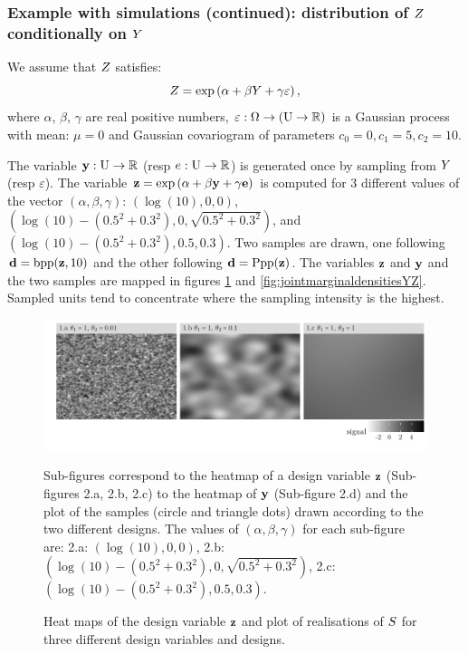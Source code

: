 \subsubsection*{Example with simulations (continued): distribution of $Z$ conditionally on $Y$}
We assume that 
$Z$ satisfies:
$$Z=\mathrm{exp}\left(\alpha+\beta Y+\gamma \varepsilon\right),$$
where $\alpha$,  $\beta$, $\gamma$ are real positive numbers, 
$\varepsilon:\Omega\to\left(\mathrm{U}\to\mathbb{R}\right)$
is a Gaussian process with mean:
$\mu=0$ and Gaussian covariogram of parameters $c_0=0,c_1=5, c_2=10$. 

The variable $\mathbf{y}:\mathrm{U}\to\mathbb{R}$ (resp $e:\mathrm{U}\to\mathbb{R}$) is generated once by sampling from $Y$ (resp $\varepsilon$). The variable $\mathbf{z}=\exp\left(\alpha+\beta\mathbf{y}+\gamma\mathbf{e}\right)$ is computed for 3 different values of the vector 
$(\alpha,\beta, \gamma)$: $\left(\log(10),0,0\right)$, $\left(\log(10)-(0.5^2+0.3^2),0,\sqrt{0.5^2+0.3^2}\right)$, and $\left(\log(10)-(0.5^2+0.3^2),0.5,0.3\right)$. Two samples are drawn, one following $\mathbf{d}=\mathrm{bpp}(\mathbf{z},10)$ and the other following $\mathbf{d}=\mathrm{Ppp}(\mathbf{z})$. 
The variables $\mathbf{z}$ and $\mathbf{y}$ and the two samples are mapped in figures \ref{fig:oaijsfdwefweoij} and \ref{fig:jointmarginaldensitiesYZ}. Sampled units tend to concentrate where the sampling intensity is the highest.


\begin{figure}[H]
    \caption{Heat maps of the design variable $\mathbf{z}$ and plot of realisations of $S$ for three different design variables and designs.}
    \label{fig:oaijsfdwefweoij}
    \hspace{-.6cm}\includegraphics{fig/figure2.pdf}
    \vspace{-1cm}
    
    
    \footnotesize{
    
%
Sub-figures correspond to the  heatmap of a design variable $\mathbf{z}$ (Sub-figures 2.a, 2.b, 2.c) to the heatmap of $\mathbf{y}$ (Sub-figure 2.d) and the plot of the samples (circle and triangle dots) drawn according to the two different designs. The values of $(\alpha, \beta ,\gamma)$ for each sub-figure are: 2.a: $(\log(10),0,0)$, 2.b:$(\log(10)-(0.5^2+0.3^2),0,\sqrt{0.5^2+0.3^2})$, 2.c: $(\log(10)-(0.5^2+0.3^2),0.5,0.3)$.}

\end{figure}


